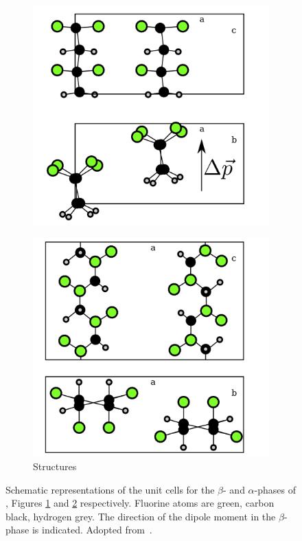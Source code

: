 \begin{figure}
\begin{subfigure}{0.5\textwidth}
\centering
	\includegraphics[width=0.8\linewidth]{./figs/chap1/betaunitcell}
	\caption{}
	\label{fig:betaunitcell}
\end{subfigure}
\begin{subfigure}{0.5\textwidth}
\centering
	\includegraphics[width=0.8\linewidth]{./figs/chap1/alphaunitcell}
	\caption{Structures}
	\label{fig:alphaunitcell}
\end{subfigure}
\caption{Schematic representations of the unit cells for the $\beta$- and $\alpha$-phases of \pvdf{}, Figures \ref{fig:betaunitcell} and \ref{fig:alphaunitcell} respectively. Fluorine atoms are green, carbon black, hydrogen grey. The direction of the dipole moment in the $\beta$-phase is indicated. Adopted from~\cite[pp. 809f]{encyclopedia}.}
\label{fig:pvdfunit}
\end{figure}

